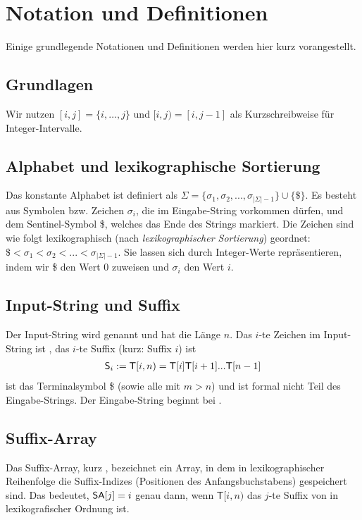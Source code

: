 \section{Notation und Definitionen}
Einige grundlegende Notationen und Definitionen werden hier kurz vorangestellt.

\subsection{Grundlagen}
Wir nutzen $[i, j] = \{i, \dots, j\}$ und $[i, j) = [i, j - 1]$ als Kurzschreibweise für Integer-Intervalle.

\subsection{Alphabet und lexikographische Sortierung}
Das konstante Alphabet ist definiert als $\Sigma = \{\sigma_1, \sigma_2, ..., \sigma_{|\Sigma|-1}\} \cup \{\$\}$.
 Es besteht aus Symbolen bzw. Zeichen $\sigma_i$, die im Eingabe-String vorkommen dürfen, und dem Sentinel-Symbol \$, welches das Ende des Strings markiert. 
 Die Zeichen sind wie folgt lexikographisch (nach \textit{lexikographischer Sortierung})
geordnet: $\$ < \sigma_1 < \sigma_2 < ... < \sigma_{|\Sigma|-1}$. 
Sie lassen sich durch Integer-Werte repräsentieren, indem wir \$ den Wert 0 zuweisen und $\sigma_i$ den Wert $i$.

\subsection{Input-String und Suffix}
Der Input-String wird  genannt und hat die Länge $n$. Das $i$-te Zeichen im
Input-String ist , das $i$-te Suffix  (kurz: Suffix $i$) ist 
\begin{align*}
\suffix{i} := \inputtext[i,n) = \inputtext[i]\inputtext[i+1]...\inputtext[n-1]
\end{align*} 
ist das Terminalsymbol \$ (sowie alle  mit $m>n$) und ist formal nicht Teil des Eingabe-Strings.
Der Eingabe-String beginnt bei .

\subsection{Suffix-Array}
Das Suffix-Array, kurz \sa, bezeichnet ein Array, in dem in lexikographischer Reihenfolge
die Suffix-Indizes (Positionen des Anfangsbuchstabens) gespeichert sind.
Das bedeutet, $\sa[j] = i$ genau dann, wenn $\mathsf{T}[i,n)$ das $j$-te Suffix von  in lexikografischer Ordnung ist.

